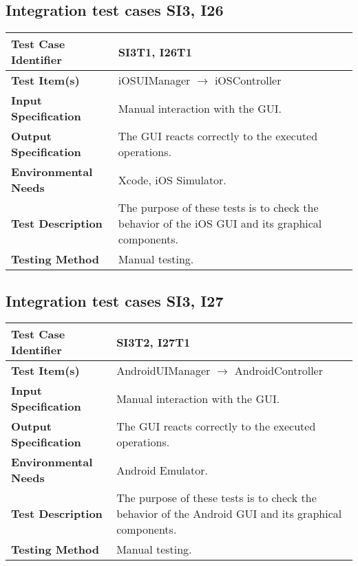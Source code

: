 \vspace{2em}

\subsection {Integration test cases SI3, I26}

\indent

\vspace{1em}

\begin{tabular}{l p{}}
    \hline
    \textbf{Test Case Identifier} & SI3T1, I26T1\\
    \hline
    \textbf{Test Item(s)} & iOSUIManager $\rightarrow$ iOSController \\
    \hline
    \textbf{Input Specification} &  Manual interaction with the GUI. \\
    \hline
    \textbf{Output Specification} &  The GUI reacts correctly to the executed operations. \\
    \hline
    \textbf{Environmental Needs} & Xcode, iOS Simulator. \\
    \hline
    \textbf{Test Description} & The purpose of these tests is to check the behavior of the iOS GUI and its graphical components.  \\
    \hline
    \textbf{Testing Method} & Manual testing. \\
    \hline
\end{tabular}

\vspace{2em}

\subsection {Integration test cases SI3, I27}

\indent

\vspace{1em}

\begin{tabular}{l p{}}
    \hline
    \textbf{Test Case Identifier} & SI3T2, I27T1\\
    \hline
    \textbf{Test Item(s)} & AndroidUIManager $\rightarrow$ AndroidController \\
    \hline
    \textbf{Input Specification} &  Manual interaction with the GUI. \\
    \hline
    \textbf{Output Specification} &  The GUI reacts correctly to the executed operations. \\
    \hline
    \textbf{Environmental Needs} & Android Emulator. \\
    \hline
    \textbf{Test Description} & The purpose of these tests is to check the behavior of the Android GUI and its graphical components.  \\
    \hline
    \textbf{Testing Method} & Manual testing. \\
    \hline
\end{tabular}

